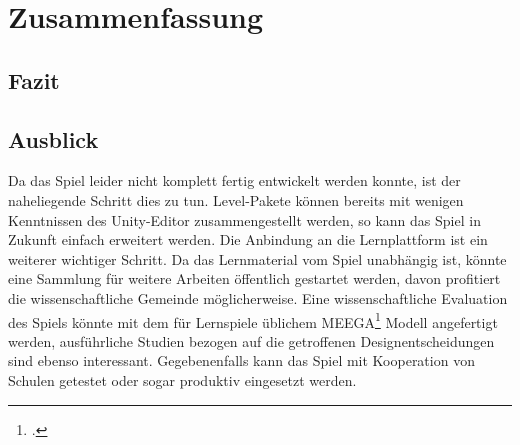 \section{Zusammenfassung}
\subsection{Fazit}
\subsection{Ausblick}
	Da das Spiel leider nicht komplett fertig entwickelt werden konnte, ist der naheliegende Schritt dies zu tun. Level-Pakete können bereits mit wenigen Kenntnissen des Unity-Editor zusammengestellt werden, so kann das Spiel in Zukunft einfach erweitert werden. Die Anbindung an die Lernplattform ist ein weiterer wichtiger Schritt.
	Da das Lernmaterial vom Spiel unabhängig ist, könnte eine Sammlung für weitere Arbeiten öffentlich gestartet werden, davon profitiert die wissenschaftliche Gemeinde möglicherweise.
	Eine wissenschaftliche Evaluation des Spiels könnte mit dem für Lernspiele üblichem MEEGA\footcite{psych1} Modell angefertigt werden, ausführliche Studien bezogen auf die getroffenen Designentscheidungen sind ebenso interessant.
	Gegebenenfalls kann das Spiel mit Kooperation von Schulen getestet oder sogar produktiv eingesetzt werden.
